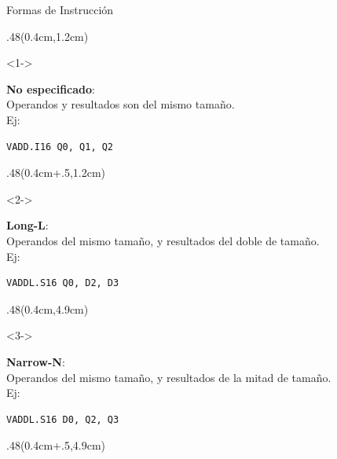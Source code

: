 \begin{frame}[fragile]{Formas de Instrucción}
 \begin{textblock*}{.48\textwidth}(0.4cm,1.2cm)
  \begin{onlyenv}<1->
   \begin{tcolorbox}[enhanced jigsaw,rounded corners, drop fuzzy shadow=ShadowColor]
    \textbf{No especificado}:\\ Operandos y resultados son del mismo tamaño.\\
    Ej:
    \begin{lstlisting}[basicstyle=\scriptsize,numbers=none]
VADD.I16 Q0, Q1, Q2
    \end{lstlisting}
   \end{tcolorbox}
  \end{onlyenv} 
 \end{textblock*}
 \begin{textblock*}{.48\textwidth}(0.4cm+.5\textwidth,1.2cm)
  \begin{onlyenv}<2->
   \begin{tcolorbox}[enhanced jigsaw,rounded corners, drop fuzzy shadow=ShadowColor]
    \textbf{Long-L}:\\ Operandos del mismo tamaño, y resultados del doble de tamaño.\\
    Ej:
    \begin{lstlisting}[basicstyle=\scriptsize,numbers=none]
VADDL.S16 Q0, D2, D3
    \end{lstlisting}
   \end{tcolorbox}
  \end{onlyenv} 
 \end{textblock*}
 \begin{textblock*}{.48\textwidth}(0.4cm,4.9cm)
  \begin{onlyenv}<3->
   \begin{tcolorbox}[enhanced jigsaw,rounded corners, drop fuzzy shadow=ShadowColor]
    \textbf{Narrow-N}:\\ Operandos del mismo tamaño, y resultados de la mitad de tamaño.\\
    Ej:
    \begin{lstlisting}[basicstyle=\scriptsize,numbers=none]
VADDL.S16 D0, Q2, Q3
    \end{lstlisting}
   \end{tcolorbox}
  \end{onlyenv} 
 \end{textblock*}
 \begin{textblock*}{.48\textwidth}(0.4cm+.5\textwidth,4.9cm)

\end{textblock*}
\end{frame}

